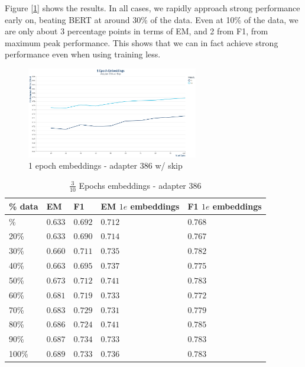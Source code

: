 Figure [\ref{fig:1_epoch_embeddings__adapter_386_with_skip}] shows the results. In all cases, we rapidly approach strong performance early on, beating BERT at around 30\% of the data. Even at 10\% of the data, we are only about 3 percentage points in terms of EM, and 2 from F1, from maximum peak performance. This shows that we can in fact achieve strong performance even when using training less. 

\begin{figure}[ht]
	\centering
	\includegraphics[width=75mm]{images/1_Epoch_Embeddings__Adapter_386_with_Skip.png}
	\caption{\label{fig:1_epoch_embeddings__adapter_386_with_skip}1 epoch embeddings - adapter 386 w/ skip}
\end{figure}

\begin{table}[ht]
	\centering
	\small
	\begin{tabular}{L{0.8cm} C{0.90cm} C{0.90cm} C{1.5cm} C{1.5cm}}
		\hline\Bstrut
		\textbf{\% data} & \textbf{EM} & \textbf{F1} & \textbf{EM \boldmath$1e$ embeddings} & \textbf{F1 \boldmath$1e$ embeddings}  \\
		\hline\Tstrut{}\%  & $0.633$ & $0.692$ & $0.712$ & $0.768$ \\[.1cm]
		20\%  & $0.633$ & $0.690$ & $0.714$ & $0.767$ \\[.1cm]
		30\%  & $0.660$ & $0.711$ & $0.735$ & $0.782$ \\[.1cm]
		40\%  & $0.663$ & $0.695$ & $0.737$ & $0.775$ \\[.1cm]
		50\%  & $0.673$ & $0.712$ & $0.741$ & $0.783$ \\[.1cm]
		60\%  & $0.681$ & $0.719$ & $0.733$ & $0.772$ \\[.1cm]
		70\%  & $0.683$ & $0.729$ & $0.731$ & $0.779$ \\[.1cm]
		80\%  & $0.686$ & $0.724$ & $0.741$ & \boldmath$0.785$ \\[.1cm]
		90\%  & $0.687$ & $0.734$ & $0.733$ & $0.783$ \\[.1cm]
		100\% & \boldmath$0.689$ & \boldmath$0.733$ & \boldmath$0.736$ & $0.783$ \\[.1cm]
		\hline
	\end{tabular}
	\caption{\label{tbl:3_10_embeddings__adpater_386}$\frac{3}{10}$ Epochs embeddings - adapter 386}
\end{table}


